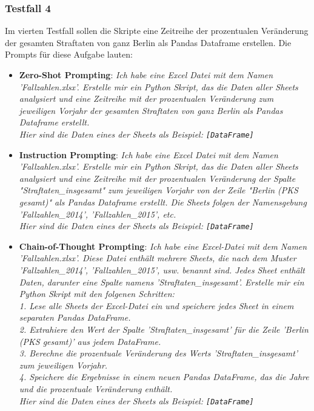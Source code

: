 \documentclass[11pt,a4paper]{article}
\begin{document}
\subsubsection{Testfall 4}
    Im vierten Testfall sollen die Skripte eine Zeitreihe der prozentualen Veränderung der gesamten Straftaten von ganz Berlin als Pandas Dataframe erstellen. Die Prompts für diese Aufgabe lauten:
    \begin{itemize}
        \item \textbf{Zero-Shot Prompting}: \emph{Ich habe eine Excel Datei mit dem Namen 'Fallzahlen.xlsx'. Erstelle mir ein Python Skript, das die Daten aller Sheets analysiert und eine Zeitreihe mit der prozentualen Veränderung zum jeweiligen Vorjahr der gesamten Straftaten von ganz Berlin als Pandas Dataframe erstellt.\\Hier sind die Daten eines der Sheets als Beispiel: \texttt{[DataFrame]}}
        \item \textbf{Instruction Prompting}: \emph{Ich habe eine Excel Datei mit dem Namen 'Fallzahlen.xlsx'. Erstelle mir ein Python Skript, das die Daten aller Sheets analysiert und eine Zeitreihe mit der prozentualen Veränderung der Spalte "Straftaten\_insgesamt" zum jeweiligen Vorjahr von der Zeile "Berlin (PKS gesamt)" als Pandas Dataframe erstellt. Die Sheets folgen der Namensgebung 'Fallzahlen\_2014', 'Fallzahlen\_2015', etc.\\Hier sind die Daten eines der Sheets als Beispiel: \texttt{[DataFrame]}}
        \item \textbf{Chain-of-Thought Prompting}: \emph{Ich habe eine Excel-Datei mit dem Namen 'Fallzahlen.xlsx'. Diese Datei enthält mehrere Sheets, die nach dem Muster 'Fallzahlen\_2014', 'Fallzahlen\_2015', usw. benannt sind. Jedes Sheet enthält Daten, darunter eine Spalte namens 'Straftaten\_insgesamt'. Erstelle mir ein Python Skript mit den folgenen Schritten:\\ 1. Lese alle Sheets der Excel-Datei ein und speichere jedes Sheet in einem separaten Pandas DataFrame.\\ 2. Extrahiere den Wert der Spalte 'Straftaten\_insgesamt' für die Zeile 'Berlin (PKS gesamt)' aus jedem DataFrame.\\ 3. Berechne die prozentuale Veränderung des Werts 'Straftaten\_insgesamt' zum jeweiligen Vorjahr.\\4. Speichere die Ergebnisse in einem neuen Pandas DataFrame, das die Jahre und die prozentuale Veränderung enthält.\\Hier sind die Daten eines der Sheets als Beispiel: \texttt{[DataFrame]}}
    \end{itemize}
\end{document}
